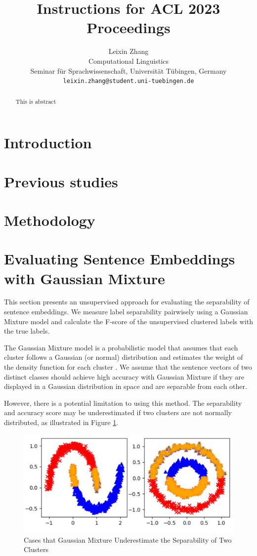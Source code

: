 \documentclass[11pt]{article}
\title{Instructions for ACL 2023 Proceedings}
\author{Leixin Zhang \\ 
    Computational Linguistics\\
    Seminar für Sprachwissenschaft,
    Universität Tübingen, Germany \\ 
    \texttt{leixin.zhang@student.uni-tuebingen.de}
    }%
\begin{document}
\maketitle
\begin{abstract}
This is abstract
\end{abstract}

\section{Introduction}


\section{Previous studies}

\section{Methodology}


\section{Evaluating Sentence Embeddings with Gaussian Mixture}

This section presents an unsupervised approach for evaluating the separability of sentence embeddings. We measure label separability pairwisely using a Gaussian Mixture model and calculate the F-score of the unsupervised clustered labels with the true labels.

The Gaussian Mixture model is a probabilistic model that assumes that each cluster follows a Gaussian (or normal) distribution and estimates the weight of the density function for each cluster \cite{reynolds2009gaussian,5298967}. We assume that the sentence vectors of two distinct classes should achieve high accuracy with Gaussian Mixture if they are displayed in a Gaussian distribution in space and are separable from each other.

However, there is a potential limitation to using this method. The separability and accuracy score may be underestimated if two clusters are not normally distributed, as illustrated in Figure \ref{fig:cirle}.


\begin{figure}[htp]
    \centering
    \includegraphics[scale=0.4]{Circle.jpg}
    \caption{Cases that Gaussian Mixture Underestimate the Separability of Two Clusters}
    \label{fig:cirle}
\end{figure}
\end{document}
